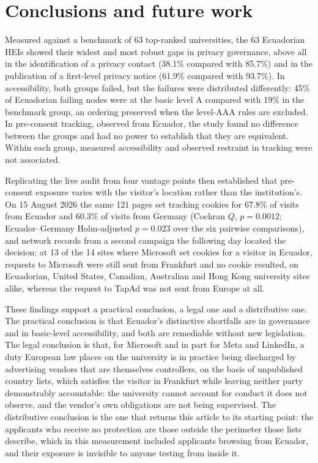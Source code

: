 \documentclass[]{interact}
\begin{document}
\section{Conclusions and future work}\label{sec:conclusions}

Measured against a benchmark of 63 top-ranked universities, the 63 Ecuadorian HEIs showed their widest and most robust gaps in privacy governance, above all in the identification of a privacy contact (38.1\% compared with 85.7\%) and in the publication of a first-level privacy notice (61.9\% compared with 93.7\%). In accessibility, both groups failed, but the failures were distributed differently: 45\% of Ecuadorian failing nodes were at the basic level A compared with 19\% in the benchmark group, an ordering preserved when the level-AAA rules are excluded. In pre-consent tracking, observed from Ecuador, the study found no difference between the groups and had no power to establish that they are equivalent. Within each group, measured accessibility and observed restraint in tracking were not associated.

Replicating the live audit from four vantage points then established that pre-consent exposure varies with the visitor's location rather than the institution's. On 15 August 2026 the same 121 pages set tracking cookies for 67.8\% of visits from Ecuador and 60.3\% of visits from Germany (Cochran $Q$, $p=0.0012$; Ecuador--Germany Holm-adjusted $p=0.023$ over the six pairwise comparisons), and network records from a second campaign the following day located the decision: at 13 of the 14 sites where Microsoft set cookies for a visitor in Ecuador, requests to Microsoft were still sent from Frankfurt and no cookie resulted, on Ecuadorian, United States, Canadian, Australian and Hong Kong university sites alike, whereas the request to TapAd was not sent from Europe at all.

These findings support a practical conclusion, a legal one and a distributive one. The practical conclusion is that Ecuador's distinctive shortfalls are in governance and in basic-level accessibility, and both are remediable without new legislation. The legal conclusion is that, for Microsoft and in part for Meta and LinkedIn, a duty European law places on the university is in practice being discharged by advertising vendors that are themselves controllers, on the basis of unpublished country lists, which satisfies the visitor in Frankfurt while leaving neither party demonstrably accountable: the university cannot account for conduct it does not observe, and the vendor's own obligations are not being supervised. The distributive conclusion is the one that returns this article to its starting point: the applicants who receive no protection are those outside the perimeter those lists describe, which in this measurement included applicants browsing from Ecuador, and their exposure is invisible to anyone testing from inside it.
\end{document}
